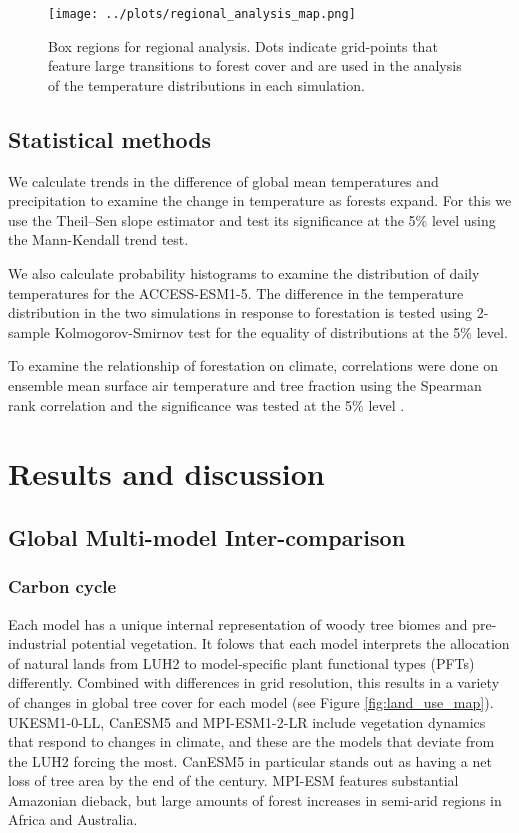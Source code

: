\documentclass[]{article}
\begin{document}
\begin{figure}[H]
    \centering
    \texttt{[image: ../plots/regional\_analysis\_map.png]}
    \caption{Box regions for regional analysis. Dots indicate grid-points that feature large transitions to forest cover and are used in the analysis of the temperature distributions in each simulation.}
    \label{fig:box_regions}
\end{figure}

\subsection{Statistical methods}

We calculate trends in the difference of global mean temperatures and precipitation to examine the change in temperature as forests expand.
For this we use the Theil–Sen slope estimator and test its significance at the 5\% level using the Mann-Kendall trend test.

We also calculate probability histograms to examine the distribution of daily temperatures for the ACCESS-ESM1-5.
The difference in the temperature distribution in the two simulations in response to forestation is tested using 2-sample Kolmogorov-Smirnov test for the equality of distributions at the 5\% level.

To examine the relationship of forestation on climate, correlations were done on ensemble mean surface air temperature and tree fraction using the Spearman rank correlation and the significance was tested at the 5\% level \parencite{kokoska2000crc}.

\section{Results and discussion}

\subsection{Global Multi-model Inter-comparison}

\subsubsection{Carbon cycle}

Each model has a unique internal representation of woody tree biomes and pre-industrial potential vegetation.
It folows that each model interprets the allocation of natural lands from LUH2 to model-specific plant functional types (PFTs) differently.
Combined with differences in grid resolution, this results in a variety of changes in global tree cover for each model (see Figure \ref{fig:land_use_map}).
UKESM1-0-LL, CanESM5 and MPI-ESM1-2-LR include vegetation dynamics that respond to changes in climate, and these are the models that deviate from the LUH2 forcing the most.
CanESM5 in particular stands out as having a net loss of tree area by the end of the century.
MPI-ESM features substantial Amazonian dieback, but large amounts of forest increases in semi-arid regions in Africa and Australia.
\end{document}
